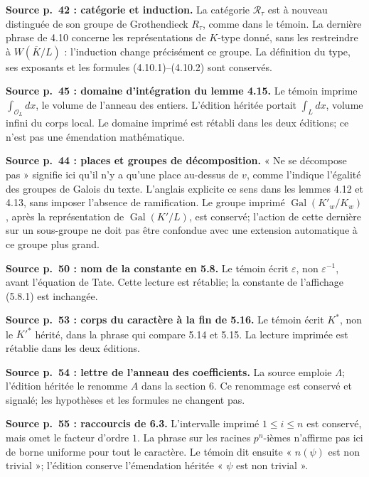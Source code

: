\documentclass[10pt,letterpaper]{article}
\newcommand{\Gal}{\operatorname{Gal}}
\providecommand{\Gal}{\operatorname{Gal}}
\providecommand{\Gal}{\operatorname{Gal}}
\providecommand{\Gal}{\operatorname{Gal}}
\providecommand{\Gal}{\operatorname{Gal}}
\begin{document}
\begin{description}[style=nextline,leftmargin=2.6em,labelwidth=2.2em,font=\normalfont\bfseries]
\item[E42] \textbf{Source p.~42 : catégorie et induction.}
La catégorie \(\mathcal R_\tau\) est à nouveau distinguée de son groupe
de Grothendieck \(R_\tau\), comme dans le témoin.
La dernière phrase de 4.10 concerne les représentations de \(K\)-type donné,
sans les restreindre à \(W(\overline K/L)\) : l'induction change précisément ce groupe.
La définition du type, ses exposants et les formules (4.10.1)--(4.10.2) sont conservés.
\item[E43] \textbf{Source p.~45 : domaine d'intégration du lemme 4.15.}
Le témoin imprime \(\int_{\mathcal O_L}dx\), le volume de l'anneau des entiers.
L'édition héritée portait \(\int_L dx\), volume infini du corps local.
Le domaine imprimé est rétabli dans les deux éditions; ce n'est pas une émendation mathématique.
\item[E44] \textbf{Source p.~44 : places et groupes de décomposition.}
« Ne se décompose pas » signifie ici qu'il n'y a qu'une place au-dessus de \(v\),
comme l'indique l'égalité des groupes de Galois du texte. L'anglais explicite ce sens
dans les lemmes 4.12 et 4.13, sans imposer l'absence de ramification.
Le groupe imprimé \(\Gal(K'_w/K_w)\), après la représentation de \(\Gal(K'/L)\),
est conservé; l'action de cette dernière sur un sous-groupe ne doit pas être
confondue avec une extension automatique à ce groupe plus grand.
\item[E45] \textbf{Source p.~50 : nom de la constante en 5.8.}
Le témoin écrit \(\varepsilon\), non \(\varepsilon^{-1}\), avant l'équation de Tate.
Cette lecture est rétablie; la constante de l'affichage (5.8.1) est inchangée.
\item[E46] \textbf{Source p.~53 : corps du caractère à la fin de 5.16.}
Le témoin écrit \(K^*\), non le \(K'^*\) hérité, dans la phrase qui compare 5.14 et 5.15.
La lecture imprimée est rétablie dans les deux éditions.
\item[E47] \textbf{Source p.~54 : lettre de l'anneau des coefficients.}
La source emploie \(\Lambda\); l'édition héritée le renomme \(A\) dans la section 6.
Ce renommage est conservé et signalé; les hypothèses et les formules ne changent pas.
\item[E48] \textbf{Source p.~55 : raccourcis de 6.3.}
L'intervalle imprimé \(1\le i\le n\) est conservé, mais omet le facteur d'ordre \(1\).
La phrase sur les racines \(p^n\)-ièmes n'affirme pas ici de borne uniforme pour tout le caractère.
Le témoin dit ensuite « \(n(\psi)\) est non trivial »; l'édition conserve l'émendation héritée « \(\psi\) est non trivial ».

\end{description}
\end{document}
